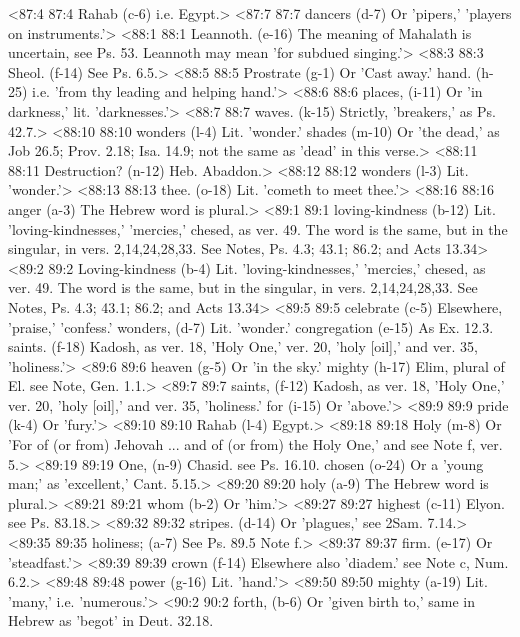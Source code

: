 <87:4 87:4  Rahab (c-6)  i.e. Egypt.>
<87:7 87:7  dancers (d-7)  Or 'pipers,' 'players on instruments.'>
<88:1 88:1  Leannoth. (e-16)  The meaning of Mahalath is uncertain, see Ps. 53.  Leannoth may mean 'for subdued singing.'>
<88:3 88:3  Sheol. (f-14)  See Ps. 6.5.>
<88:5 88:5  Prostrate (g-1)  Or 'Cast away.'
  hand. (h-25)  i.e. 'from thy leading and helping hand.'>
<88:6 88:6  places, (i-11)  Or 'in darkness,' lit. 'darknesses.'>
<88:7 88:7  waves. (k-15)  Strictly, 'breakers,' as Ps. 42.7.>
<88:10 88:10  wonders (l-4) Lit. 'wonder.'
  shades (m-10)  Or 'the dead,' as Job 26.5; Prov. 2.18; Isa. 14.9; not the  same as 'dead' in this verse.>
<88:11 88:11  Destruction? (n-12)  Heb. Abaddon.>
<88:12 88:12  wonders (l-3)  Lit. 'wonder.'>
<88:13 88:13  thee. (o-18)  Lit. 'cometh to meet thee.'>
<88:16 88:16  anger (a-3) The Hebrew word is plural.>
<89:1 89:1  loving-kindness (b-12)  Lit. 'loving-kindnesses,' 'mercies,' chesed, as ver. 49.  The word is the same, but in the singular, in vers. 2,14,24,28,33. See Notes, Ps. 4.3; 43.1; 86.2; and Acts 13.34>
<89:2 89:2  Loving-kindness (b-4)  Lit. 'loving-kindnesses,' 'mercies,' chesed, as ver. 49.  The word is the same, but in the singular, in vers. 2,14,24,28,33. See Notes, Ps. 4.3; 43.1; 86.2; and Acts 13.34>
<89:5 89:5  celebrate (c-5)  Elsewhere, 'praise,' 'confess.'
  wonders, (d-7)  Lit. 'wonder.'
  congregation (e-15)  As Ex. 12.3.
  saints. (f-18) Kadosh, as ver. 18, 'Holy One,' ver. 20, 'holy [oil],' and  ver. 35, 'holiness.'>
<89:6 89:6  heaven (g-5)  Or 'in the sky.'
  mighty (h-17)  Elim, plural of El. see Note, Gen. 1.1.>
<89:7 89:7  saints, (f-12)  Kadosh, as ver. 18, 'Holy One,' ver. 20, 'holy [oil],' and  ver. 35, 'holiness.'
  for (i-15)  Or 'above.'>
<89:9 89:9  pride (k-4)  Or 'fury.'>
<89:10 89:10  Rahab (l-4)  Egypt.>
<89:18 89:18  Holy (m-8)  Or 'For of (or from) Jehovah ... and of (or from) the Holy  One,' and see Note f, ver. 5.>
<89:19 89:19  One, (n-9)  Chasid. see Ps. 16.10.
  chosen (o-24)  Or a 'young man;' as 'excellent,' Cant. 5.15.>
<89:20 89:20  holy (a-9)  The Hebrew word is plural.>
<89:21 89:21  whom (b-2)  Or 'him.'>
<89:27 89:27  highest (c-11)  Elyon. see Ps. 83.18.>
<89:32 89:32  stripes. (d-14)  Or 'plagues,' see 2Sam. 7.14.>
<89:35 89:35  holiness; (a-7)  See Ps. 89.5 Note f.>
<89:37 89:37  firm. (e-17)  Or 'steadfast.'>
<89:39 89:39  crown (f-14)  Elsewhere also 'diadem.' see Note c, Num. 6.2.>
<89:48 89:48  power (g-16)  Lit. 'hand.'>
<89:50 89:50  mighty (a-19)  Lit. 'many,' i.e. 'numerous.'>
<90:2 90:2  forth, (b-6)  Or 'given birth to,' same in Hebrew as 'begot' in Deut. 32.18.

